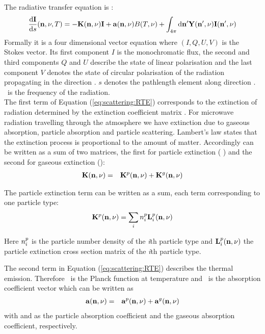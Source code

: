 \label{sec:scattering:general_rte}
 

The radiative transfer equation is \citep{mishchenko00:_light_scatt_nonsp_partic}: 
\begin{eqnarray}
     \frac{\mathrm{d} {\bf I}}{\mathrm{d} s}({\bf n}, \nu, T) =
     -{\bf K}({\bf n}, \nu){\bf I}+{\bf a}({\bf n}, \nu) B(T, \nu)
     +\int_{4\pi} \mathrm{d} {\bf n}^\prime {\bf Y}({\bf n}^\prime, \nu) {\bf I}({\bf n}^\prime, \nu) 
\label{eq:scattering:RTE} 
\end{eqnarray} 
Formally it is a four dimensional vector equation where \StoVec
$(I,Q,U,V)$ is the Stokes vector.
Its first component $I$ is the monochromatic flux, the
second and third components $Q$ and $U$ describe the state of linear
polarisation and the last component $V$ denotes the state of circular
polarisation of the radiation propagating in the direction \PDir.
\DiffD $s$ denotes the pathlength element along direction \PDir. \Frq\ 
is the frequency of the radiation.
\\

The first term of Equation (\ref{eq:scattering:RTE}) corresponds to the extinction of
radiation determined by the extinction coefficient matrix \ExtMat
. For microwave radiation travelling through the atmosphere we
have extinction due to gaseous
absorption, particle absorption and  particle scattering. Lambert's law
states that the extinction process is
proportional to the amount of matter. Accordingly \ExtMat can be written as
a sum of two matrices, the first for particle extinction ( \aExtMat{p})
and the second for gaseous extinction (\aExtMat{g}):
\begin{eqnarray}
  {\bf K}({\bf n}, \nu) &=&
  {\bf K}^{p}({\bf n}, \nu)+{\bf K}^{g}({\bf n}, \nu)
\end{eqnarray}

The particle extinction term can be written as a sum, each term
corresponding to one particle type:
\begin{eqnarray}
  {\bf K}^{p}({\bf n}, \nu) = \sum_i n^p_i {\bf L}^{p}_i ({\bf n}, \nu)
\end{eqnarray}

Here $n^p_i$ is the particle number density of the
{\sl i}th particle type and  ${\bf L}^{p}_i({\bf n}, \nu)$  the particle
extinction cross section matrix of the
{\sl i}th particle type.

The second term in Equation (\ref{eq:scattering:RTE})  describes the thermal
emission. Therefore \Planck\  is the Planck
function at temperature \Tmp and \AbsVec\  is the absorption
coefficient vector which can be written as
 \begin{eqnarray}
  {\bf a} ({\bf n}, \nu)  &=& {\bf a}^{p} ({\bf n}, \nu) + {\bf a}^{g} ({\bf n}, \nu) 
  \end{eqnarray}
with  and  as the particle
absorption 
coefficient
and the gaseous absorption coefficient, respectively. 

